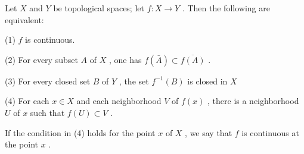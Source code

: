 \begin{theorem} Let \(X\) and \(Y\) be topological spaces; let \(f : X \rightarrow  Y\) . Then the following are equivalent:

(1) \(f\) is continuous.

(2) For every subset \(A\) of \(X\) , one has \(f\left( \bar{A}\right)  \subset  \overline{f\left( A\right) }\) .

(3) For every closed set \(B\) of \(Y\) , the set \({f}^{-1}\left( B\right)\) is closed in \(X\)

(4) For each \(x \in  X\) and each neighborhood \(V\) of \(f\left( x\right)\) , there is a neighborhood \(U\) of \(x\) such that \(f\left( U\right)  \subset  V\) .

If the condition in (4) holds for the point \(x\) of \(X\) , we say that \(f\) is continuous at the point \(x\) .

\end{theorem}
